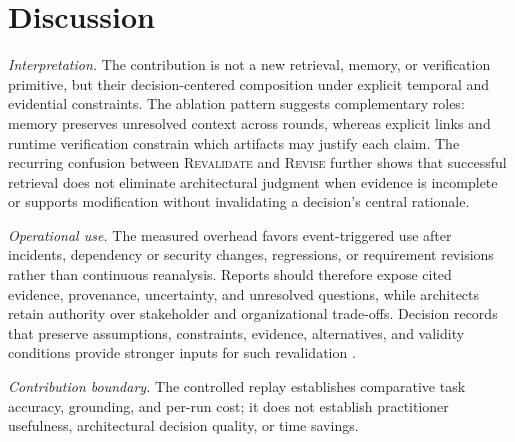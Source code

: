 \documentclass[10pt,conference]{IEEEtran}
\begin{document}
\section{Discussion}
\label{sec:discussion}
\noindent\textit{Interpretation.} The contribution is not a new retrieval, memory, or verification primitive, but their decision-centered composition under explicit temporal and evidential constraints. The ablation pattern suggests complementary roles: memory preserves unresolved context across rounds, whereas explicit links and runtime verification constrain which artifacts may justify each claim. The recurring confusion between \textsc{Revalidate} and \textsc{Revise} further shows that successful retrieval does not eliminate architectural judgment when evidence is incomplete or supports modification without invalidating a decision's central rationale.\par\noindent\textit{Operational use.} The measured overhead favors event-triggered use after incidents, dependency or security changes, regressions, or requirement revisions rather than continuous reanalysis. Reports should therefore expose cited evidence, provenance, uncertainty, and unresolved questions, while architects retain authority over stakeholder and organizational trade-offs. Decision records that preserve assumptions, constraints, evidence, alternatives, and validity conditions provide stronger inputs for such revalidation \cite{Jansen2005Decisions,Tyree2005Decisions}.\par\noindent\textit{Contribution boundary.} The controlled replay establishes comparative task accuracy, grounding, and per-run cost; it does not establish practitioner usefulness, architectural decision quality, or time savings.
\end{document}
